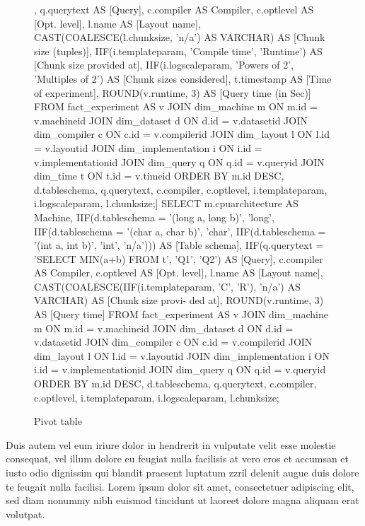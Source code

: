 \documentclass[10pt]{scrartcl}
\begin{document}
\clearpage
\begin{wrapfigure}{r}{0.52\textwidth}
{ \centering %
\pivotTable[width=0.5\textwidth, height=0.8\textwidth, scale=0.5, rows={["Machine", "Table schema", "Query"]}, aggregation=Minimum, aggregationattribute=Query time, aggregationBig=Minimum, aggregationattributeBig=Query time (in Sec)]
[SELECT
m.cpu + ' (' +  m.cpuarchitecture + ')' AS Machine,
d.tableschema   AS [Table schema],
q.querytext     AS [Query],
c.compiler      AS Compiler,
c.optlevel      AS [Opt. level],
l.name          AS [Layout name],
CAST(COALESCE(l.chunksize, 'n/a') AS VARCHAR) AS [Chunk size (tuples)],
IIF(i.templateparam, 'Compile time', 'Runtime') AS [Chunk size provided at],
IIF(i.logscaleparam, 'Powers of 2', 'Multiples of 2') AS [Chunk sizes considered],
t.timestamp 	AS [Time of experiment],
ROUND(v.runtime, 3) 		AS [Query time (in Sec)]
FROM fact_experiment AS v
    JOIN dim_machine m ON m.id = v.machineid
    JOIN dim_dataset d ON d.id = v.datasetid
    JOIN dim_compiler c ON c.id = v.compilerid
    JOIN dim_layout l ON l.id = v.layoutid
    JOIN dim_implementation i ON i.id = v.implementationid
    JOIN dim_query q ON q.id = v.queryid
    JOIN dim_time t ON t.id = v.timeid
ORDER BY m.id DESC, d.tableschema, q.querytext,
    c.compiler, c.optlevel, i.templateparam, i.logscaleparam, l.chunksize;]
{SELECT
m.cpuarchitecture AS Machine,
IIF(d.tableschema = '(long a, long b)', 'long', IIF(d.tableschema = '(char a, char b)', 'char', IIF(d.tableschema = '(int a, int b)', 'int', 'n/a')))   AS [Table schema],
IIF(q.querytext = 'SELECT MIN(a+b) FROM t', 'Q1', 'Q2')     AS [Query],
c.compiler      AS Compiler,
c.optlevel      AS [Opt. level],
l.name          AS [Layout name],
CAST(COALESCE(IIF(i.templateparam, 'C', 'R'), 'n/a') AS VARCHAR) AS [Chunk size provi- ded at],
ROUND(v.runtime, 3) 		AS [Query time]
FROM fact_experiment AS v
    JOIN dim_machine m ON m.id = v.machineid
    JOIN dim_dataset d ON d.id = v.datasetid
    JOIN dim_compiler c ON c.id = v.compilerid
    JOIN dim_layout l ON l.id = v.layoutid
    JOIN dim_implementation i ON i.id = v.implementationid
    JOIN dim_query q ON q.id = v.queryid
ORDER BY m.id DESC, d.tableschema, q.querytext,
    c.compiler, c.optlevel, i.templateparam, i.logscaleparam, l.chunksize;}
\\ }
\vspace{-5pt}
\caption{Pivot table}
\vspace{-23pt}
\end{wrapfigure}
Duis autem vel eum iriure dolor in hendrerit in vulputate velit esse molestie consequat, vel illum dolore eu feugiat nulla facilisis at vero eros et accumsan et iusto odio dignissim qui blandit praesent luptatum zzril delenit augue duis dolore te feugait nulla facilisi. Lorem ipsum dolor sit amet, consectetuer adipiscing elit, sed diam nonummy nibh euismod tincidunt ut laoreet dolore magna aliquam erat volutpat.\\[8pt]
\end{document}

